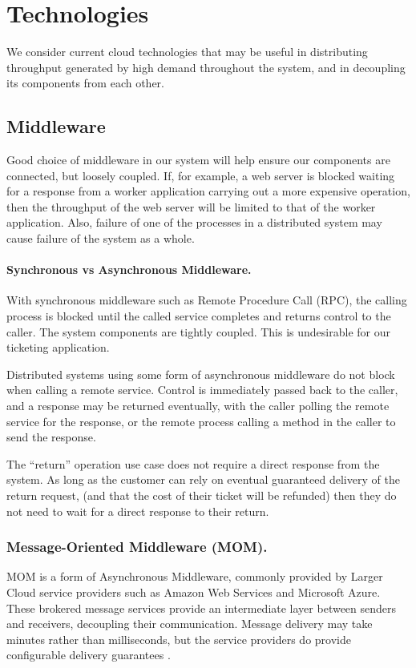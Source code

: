 %
%

\section{Technologies}

We consider current cloud technologies that may be useful in distributing throughput generated by high demand throughout the system, and in decoupling its components from each other.

%
%

\subsection{Middleware}

Good choice of middleware in our system will help ensure our components are connected, but loosely coupled.  If, for example, a web server is blocked waiting for a response from a worker application carrying out a more expensive operation, then the throughput of the web server will be limited to that of the worker application.  Also, failure of one of the processes in a distributed system may cause failure of the system as a whole.

\paragraph{Synchronous vs Asynchronous Middleware.}
With synchronous middleware such as Remote Procedure Call (RPC), the calling process is blocked until the called service completes and returns control to the caller.  The system components are tightly coupled.  This is undesirable for our ticketing application.

Distributed systems using some form of asynchronous middleware do not block when calling a remote service.  Control is immediately passed back to the caller, and a response may be returned eventually, with the caller polling the remote service for the response, or the remote process calling a method in the caller to send the response.

The ``return'' operation use case does not require a direct response from the system.  As long as the customer can rely on eventual guaranteed delivery of the return request, (and that the cost of their ticket will be refunded) then they do not need to wait for a direct response to their return.

\subsubsection{Message-Oriented Middleware (MOM).}  MOM is a form of Asynchronous Middleware, commonly provided by Larger Cloud service providers such as Amazon Web Services and Microsoft Azure.  These brokered message services provide an intermediate layer between senders and receivers, decoupling their communication.  Message delivery may take minutes rather than milliseconds, but the service providers do provide configurable delivery guarantees \cite{RN65}.

